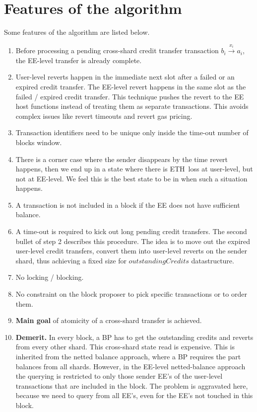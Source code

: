\documentclass{IEEEtran}
\newcommand{\eth}[0]{ETH~}
\begin{document}
\section{Features of the algorithm}
Some features of the algorithm are listed below.
\begin{enumerate}
\item Before processing a pending cross-shard credit transfer transaction $b_i \stackrel{x_i}{\longrightarrow} a_i$, the EE-level transfer is already complete. 
\item User-level reverts happen in the immediate next slot after a failed or an expired credit transfer. The EE-level revert happens in the same slot as the failed / expired credit transfer. This technique pushes the revert to the EE host functions instead of treating them as separate transactions. This avoids complex issues like revert timeouts and revert gas pricing.
\item Transaction identifiers need to be unique only inside the time-out number of blocks window.
\item  There is a corner case where the sender disappears by the time revert happens, then we end up in a state where there is \eth loss at user-level, but not at EE-level. We feel this is the best state to be in when such a situation happens.
\item A transaction is not included in a block if the EE does not have sufficient balance. 
\item A time-out is required to kick out long pending credit transfers. The second bullet of step 2 describes this procedure. The idea is to move out the expired user-level credit transfers, convert them into user-level reverts on the sender shard, thus achieving a fixed size for $outstandingCredits$ datastructure.
\item No locking / blocking.
\item No constraint on the block proposer to pick specific transactions or to order them.
\item {\bf Main goal} of atomicity of a cross-shard transfer is achieved.
\item {\bf Demerit.} In every block, a BP has to get the outstanding credits and reverts from every other shard. This cross-shard state read is expensive. This is inherited from the netted balance approach, where a BP requires the part balances from all shards. However, in the EE-level netted-balance approach the querying is restricted to only those sender EE's of the user-level transactions that are included in the block. The problem is aggravated here, because we need to query from all EE's, even for the EE's not touched in this block.
\end{enumerate}
\end{document}
